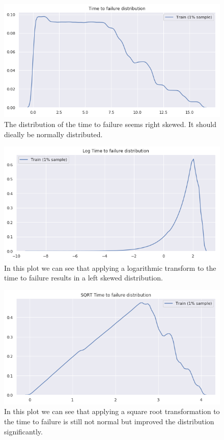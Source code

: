 \documentclass[]{llncs} %
\begin{document}
\begin{figure}
	\centering
	\includegraphics[width=.9\linewidth]{timeToFailureDistribution}
	\caption{The distribution of the time to failure seems right skewed. It should dieally be normally distributed.}
	\label{fig:timeToFailureDistribution}
\end{figure}
\begin{figure}
	\centering
	\includegraphics[width=.9\linewidth]{logTimeToFailureDistribution}
	\caption{In this plot we can see that applying a logarithmic transform to the time to failure results in a left skewed distribution.}
	\label{fig:logTimeToFailureDistribution}
\end{figure}
\begin{figure}
	\centering
	\includegraphics[width=.9\linewidth]{sqrtTimeToFailureDistribution}
	\caption{In this plot we can see that applying a square root transformation to the time to failure is still not normal but improved the distribution significantly.}
	\label{fig:sqrtTimeToFailureDistribution}
\end{figure}
\clearpage
\newpage
\end{document}
